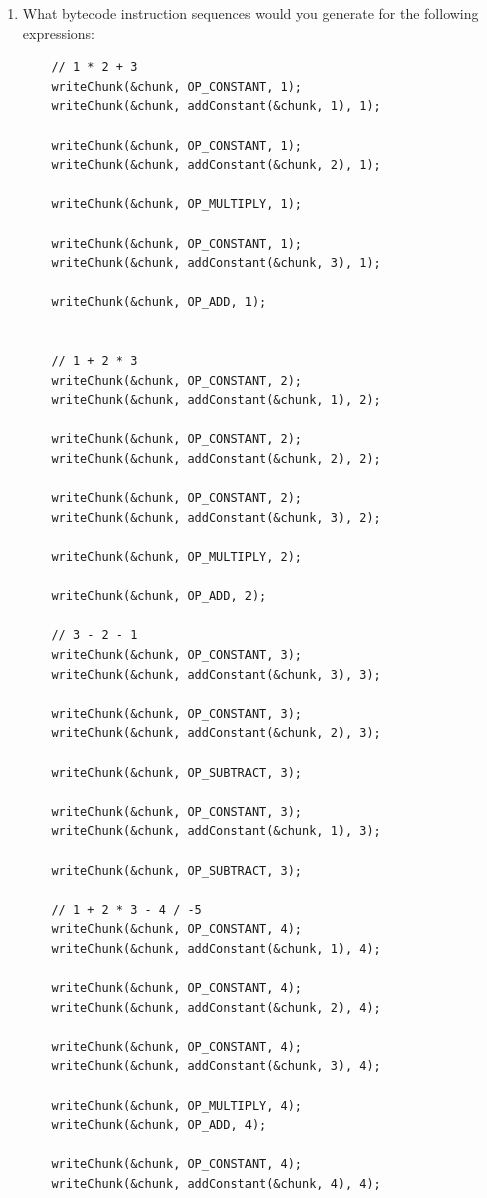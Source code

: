 \documentclass{article}
\begin{document}
\begin{enumerate}
    \item {
        What bytecode instruction sequences would you generate for the following expressions:

        \begin{verbatim}
    // 1 * 2 + 3
    writeChunk(&chunk, OP_CONSTANT, 1);
    writeChunk(&chunk, addConstant(&chunk, 1), 1);

    writeChunk(&chunk, OP_CONSTANT, 1);
    writeChunk(&chunk, addConstant(&chunk, 2), 1);

    writeChunk(&chunk, OP_MULTIPLY, 1);

    writeChunk(&chunk, OP_CONSTANT, 1);
    writeChunk(&chunk, addConstant(&chunk, 3), 1);

    writeChunk(&chunk, OP_ADD, 1);


    // 1 + 2 * 3
    writeChunk(&chunk, OP_CONSTANT, 2);
    writeChunk(&chunk, addConstant(&chunk, 1), 2);

    writeChunk(&chunk, OP_CONSTANT, 2);
    writeChunk(&chunk, addConstant(&chunk, 2), 2);

    writeChunk(&chunk, OP_CONSTANT, 2);
    writeChunk(&chunk, addConstant(&chunk, 3), 2);

    writeChunk(&chunk, OP_MULTIPLY, 2);

    writeChunk(&chunk, OP_ADD, 2);

    // 3 - 2 - 1
    writeChunk(&chunk, OP_CONSTANT, 3);
    writeChunk(&chunk, addConstant(&chunk, 3), 3);

    writeChunk(&chunk, OP_CONSTANT, 3);
    writeChunk(&chunk, addConstant(&chunk, 2), 3);

    writeChunk(&chunk, OP_SUBTRACT, 3);

    writeChunk(&chunk, OP_CONSTANT, 3);
    writeChunk(&chunk, addConstant(&chunk, 1), 3);

    writeChunk(&chunk, OP_SUBTRACT, 3);

    // 1 + 2 * 3 - 4 / -5
    writeChunk(&chunk, OP_CONSTANT, 4);
    writeChunk(&chunk, addConstant(&chunk, 1), 4);

    writeChunk(&chunk, OP_CONSTANT, 4);
    writeChunk(&chunk, addConstant(&chunk, 2), 4);

    writeChunk(&chunk, OP_CONSTANT, 4);
    writeChunk(&chunk, addConstant(&chunk, 3), 4);

    writeChunk(&chunk, OP_MULTIPLY, 4);
    writeChunk(&chunk, OP_ADD, 4);

    writeChunk(&chunk, OP_CONSTANT, 4);
    writeChunk(&chunk, addConstant(&chunk, 4), 4);


\end{verbatim}}
\end{enumerate}
\end{document}
